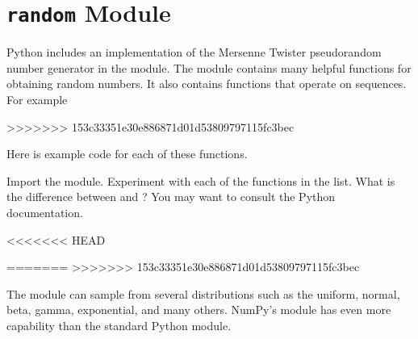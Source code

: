\section*{\texttt{random} Module}
Python includes an implementation of the Mersenne Twister pseudorandom number generator in the  module.
The  module contains many helpful functions for obtaining random numbers.
It also contains functions that operate on sequences.  For example
>>>>>>> 153c33351e30e886871d01d53809797115fc3bec

Here is example code for each of these functions.
\begin{problem}
Import the  module.  Experiment with each of the functions in the list.  What is the difference between  and ?  You may want to consult the Python documentation.
\end{problem}
<<<<<<< HEAD

%
=======
>>>>>>> 153c33351e30e886871d01d53809797115fc3bec

The  module can sample from several distributions such as the uniform, normal, beta, gamma, exponential, and many others.
NumPy's  module has even more capability than the standard Python  module.

